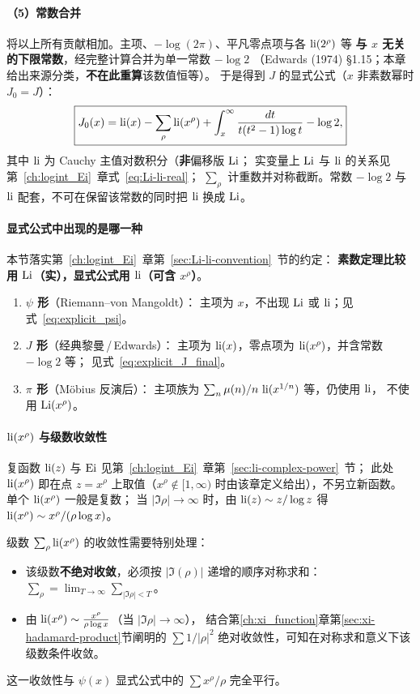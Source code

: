 \paragraph{（5）常数合并}
将以上所有贡献相加。主项、$-\log(2\pi)$、平凡零点项与各 $\operatorname{li}(2^\rho)$ 等
\textbf{与 $x$ 无关的下限常数}，经完整计算合并为单一常数 $-\log 2$
（Edwards (1974) §1.15；本章给出来源分类，\textbf{不在此重算}该数值恒等）。
于是得到 $J$ 的显式公式（$x$ 非素数幂时 $J_0=J$）：
\begin{equation}
\boxed{J_0(x) = \operatorname{li}(x) - \sum_\rho \operatorname{li}(x^\rho) + \int_x^\infty \frac{dt}{t(t^2-1)\log t} - \log 2,}
\label{eq:explicit_J_final}
\end{equation}
其中 $\operatorname{li}$ 为 Cauchy 主值对数积分（\textbf{非}偏移版 $\operatorname{Li}$；
实变量上 $\operatorname{Li}$ 与 $\operatorname{li}$ 的关系见第~\ref{ch:logint_Ei}~章式~\eqref{eq:Li-li-real}；
$\sum_\rho$ 计重数并对称截断。常数 $-\log 2$ 与 $\operatorname{li}$ 配套，不可在保留该常数的同时把 $\operatorname{li}$ 换成 $\operatorname{Li}$。

\paragraph{显式公式中出现的是哪一种}
本节落实第~\ref{ch:logint_Ei}~章第~\ref{sec:Li-li-convention}~节的约定：
\textbf{素数定理比较用 $\operatorname{Li}$（实），显式公式用 $\operatorname{li}$（可含 $x^{\rho}$）}。
\begin{enumerate}
  \item \textbf{$\psi$ 形}（Riemann--von Mangoldt）：
    主项为 $x$，不出现 $\operatorname{Li}$ 或 $\operatorname{li}$；见式~\eqref{eq:explicit_psi}。
  \item \textbf{$J$ 形}（经典黎曼\,/\,Edwards）：
    主项为 $\operatorname{li}(x)$，零点项为 $\operatorname{li}(x^{\rho})$，并含常数 $-\log 2$ 等；
    见式~\eqref{eq:explicit_J_final}。
  \item \textbf{$\pi$ 形}（Möbius 反演后）：
    主项族为 $\sum_{n}\mu(n)/n\,\operatorname{li}(x^{1/n})$ 等，仍使用 $\operatorname{li}$，
    不使用 $\operatorname{Li}(x^{\rho})$。
\end{enumerate}

\paragraph{$\operatorname{li}(x^\rho)$ 与级数收敛性}
复函数 $\operatorname{li}(z)$ 与 $\operatorname{Ei}$ 见第~\ref{ch:logint_Ei}~章第~\ref{sec:li-complex-power}~节；
此处 $\operatorname{li}(x^{\rho})$ 即在点 $z=x^{\rho}$ 上取值（$x^{\rho}\notin[1,\infty)$ 时由该章定义给出），不另立新函数。
单个 $\operatorname{li}(x^{\rho})$ 一般是复数；
当 $|\Im\rho|\to\infty$ 时，由 $\operatorname{li}(z)\sim z/\log z$ 得
$\operatorname{li}(x^{\rho})\sim x^{\rho}/(\rho\log x)$。

级数 $\sum_{\rho} \operatorname{li}(x^\rho)$ 的收敛性需要特别处理：
\begin{itemize}
  \item 该级数\textbf{不绝对收敛}，必须按 $|\Im(\rho)|$ 递增的顺序对称求和：
        $\sum_{\rho} = \lim_{T\to\infty} \sum_{|\Im\rho|<T}$。
  \item 由 $\operatorname{li}(x^\rho) \sim \frac{x^\rho}{\rho\log x}$（当 $|\Im\rho|\to\infty$），
        结合第\ref{ch:xi_function}章第\ref{sec:xi-hadamard-product}节阐明的 $\sum 1/|\rho|^2$ 绝对收敛性，可知在对称求和意义下该级数条件收敛。
\end{itemize}
这一收敛性与 $\psi(x)$ 显式公式中的 $\sum x^\rho/\rho$ 完全平行。

